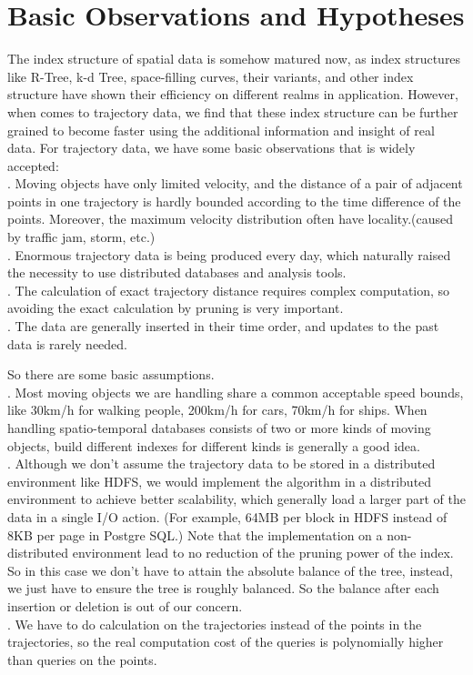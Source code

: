 \documentclass[sigplan]{acmart}
\begin{document}
\section{Basic Observations and Hypotheses}
The index structure of spatial data is somehow matured now, as index structures like R-Tree, k-d Tree, space-filling curves, their variants, and other index structure have shown their efficiency on different realms in application. However, when comes to trajectory data, we find that these index structure can be further grained to become faster using the additional information and insight of real data. For trajectory data, we have some basic observations that is widely accepted: \\
. Moving objects have only limited velocity, and the distance of a pair of adjacent points in one trajectory is hardly bounded according to the time difference of the points. Moreover, the maximum velocity distribution often have locality.(caused by traffic jam, storm, etc.)\\
. Enormous trajectory data is being produced every day, which naturally raised the necessity to use distributed databases and analysis tools.\\
. The calculation of exact trajectory distance requires complex computation, so avoiding the exact calculation by pruning is very important.\\
. The data are generally inserted in their time order, and updates to the past data is rarely needed.\\
\par
So there are some basic assumptions.\\
. Most moving objects we are handling share a common acceptable speed bounds, like 30km/h for walking people, 200km/h for cars, 70km/h for ships. When handling spatio-temporal databases consists of two or more kinds of moving objects, build different indexes for different kinds is generally a good idea.\\
. Although we don't assume the trajectory data to be stored in a distributed environment like HDFS, we would implement the algorithm in a distributed environment to achieve better scalability, which generally load a larger part of the data in a single I/O action. (For example, 64MB per block in HDFS instead of 8KB per page in Postgre SQL.) Note that the implementation on a non-distributed environment lead to no reduction of the pruning power of the index. So in this case we don't have to attain the absolute balance of the tree, instead, we just have to ensure the tree is roughly balanced. So the balance after each insertion or deletion is out of our concern.\\
. We have to do calculation on the trajectories instead of the points in the trajectories, so the real computation cost of the queries is polynomially higher than queries on the points.\par
\end{document}
